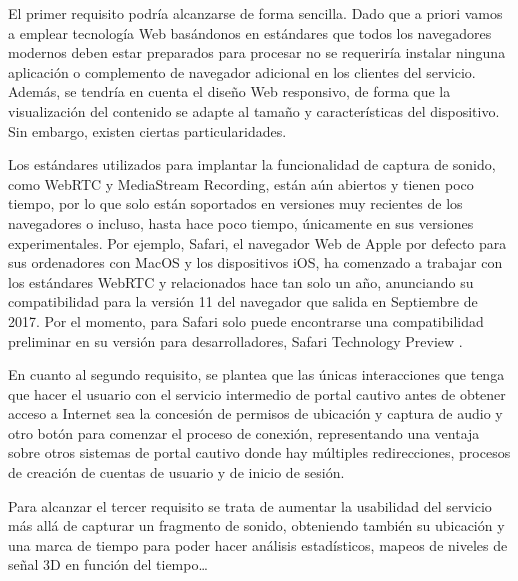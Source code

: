 El primer requisito podría alcanzarse de forma sencilla. Dado que a priori vamos a emplear tecnología Web basándonos en estándares que todos los navegadores modernos deben estar preparados para procesar no se requeriría instalar ninguna aplicación o complemento de navegador adicional en los clientes del servicio. Además, se tendría en cuenta el diseño Web responsivo, de forma que la visualización del contenido se adapte al tamaño y características del dispositivo. Sin embargo, existen ciertas particularidades.

Los estándares utilizados para implantar la funcionalidad de captura de sonido, como WebRTC y MediaStream Recording, están aún abiertos y tienen poco tiempo, por lo que solo están soportados en versiones muy recientes de los navegadores o incluso, hasta hace poco tiempo, únicamente en sus versiones experimentales. Por ejemplo, Safari, el navegador Web de Apple por defecto para sus ordenadores con MacOS y los dispositivos iOS, ha comenzado a trabajar con los estándares WebRTC y relacionados hace tan solo un año, anunciando su compatibilidad para la versión 11 del navegador que salida en Septiembre de 2017. Por el momento, para Safari solo puede encontrarse una compatibilidad preliminar en su versión para desarrolladores, Safari Technology Preview \cite{SafariWebRTC}.

En cuanto al segundo requisito, se plantea que las únicas interacciones que tenga que hacer el usuario con el servicio intermedio de portal cautivo antes de obtener acceso a Internet sea la concesión de permisos de ubicación y captura de audio y otro botón para comenzar el proceso de conexión, representando una ventaja sobre otros sistemas de portal cautivo donde hay múltiples redirecciones, procesos de creación de cuentas de usuario y de inicio de sesión.

Para alcanzar el tercer requisito se trata de aumentar la usabilidad del servicio más allá de capturar un fragmento de sonido, obteniendo también su ubicación y una marca de tiempo para poder hacer análisis estadísticos, mapeos de niveles de señal 3D en función del tiempo…\\

